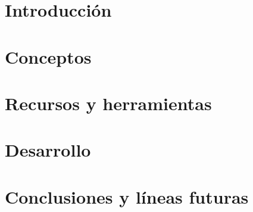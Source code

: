 \documentclass[spanish,a4paper,14pt,oneside]{extreport}
\begin{document}
\listoftables

\newpage{\pagestyle{empty}}

\renewcommand{\thepage}{\arabic{page}}
\setcounter{page}{1}


\chapter{Introducción}
\label{chapter:introduccion}




\chapter{Conceptos}
\label{chapter:conceptos}



\newpage{\pagestyle{empty}}
\thispagestyle{empty}

\chapter{Recursos y herramientas}
\label{chapter:recursos}




\chapter{Desarrollo}
\label{chapter:desarrollo}



\newpage{\pagestyle{empty}}
\thispagestyle{empty}

\chapter{Conclusiones y líneas futuras}
\label{chapter:conclusiones}


\end{document}
